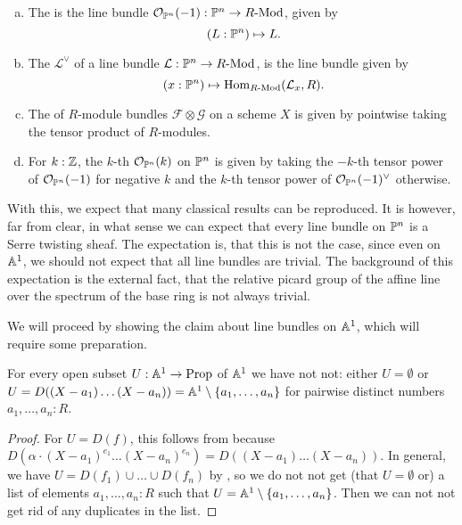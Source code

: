 \begin{definition}
  \begin{enumerate}[(a)]
  \item The  is the line bundle $\mathcal O_{\mathbb{P}^n}(-1):\mathbb{P}^n\to R\text{-}\mathrm{Mod}$,
    given by
    \[ (L:\bP^n)\mapsto L\rlap{.}\]
  \item The  $\mathcal L^\vee$ of a line bundle $\mathcal L:\mathbb{P}^n\to R\text{-}\mathrm{Mod}$,
    is the line bundle given by
    \[ (x:\bP^n)\mapsto \Hom_{\Mod{R}}(\mathcal L_x,R)\rlap{.}\]
  \item The  of $R$-module bundles $\mathcal F\otimes \mathcal G$
    on a scheme $X$
    is given by pointwise taking the tensor product of $R$-modules.
  \item For $k:\mathbb{Z}$, the $k$-th  $\mathcal{O}_{\mathbb{P}^n}(k)$ on $\mathbb{P}^n$
    is given by taking the $-k$-th tensor power of $\mathcal O_{\mathbb{P}^n}(-1)$ for negative $k$
    and the $k$-th tensor power of $\mathcal O_{\mathbb{P}^n}(-1)^{\vee}$ otherwise.
  \end{enumerate}
\end{definition}

With this, we expect that many classical results can be reproduced.
It is however, far from clear, in what sense we can expect that every line bundle on $\mathbb{P}^n$
is a Serre twisting sheaf.
The expectation is, that this is not the case,
since even on $\mathbb{A}^1$, we should not expect that all line bundles are trivial.
The background of this expectation is the external fact, that the relative picard group of
the affine line over the spectrum of the base ring is not always trivial.

We will proceed by showing the claim about line bundles on $\mathbb{A}^1$,
which will require some preparation.

\begin{lemma}
  For every open subset $U : \mathbb{A}^1 \to \mathrm{Prop}$ of $\mathbb{A}^1$
  we have not not:
  either $U = \emptyset$
  or $U = D((X - a_1)\dots(X - a_n)) = \mathbb{A}^1 \setminus \{ a_1, \dots, a_n \}$
  for pairwise distinct numbers $a_1, \dots, a_n : R$.
\end{lemma}

\begin{proof}
  For $U = D(f)$,
  this follows from 
  because $D(\alpha \cdot {(X - a_1)}^{e_1} \dots {(X - a_n)}^{e_n})
  = D((X - a_1) \dots (X - a_n))$.
  In general,
  we have $U = D(f_1) \cup \dots \cup D(f_n)$
  by ,
  so we do not not get
  (that $U = \emptyset$ or)
  a list of elements $a_1, \dots, a_n : R$
  such that $U = \mathbb{A}^1 \setminus \{ a_1, \dots, a_n \}$.
  Then we can not not get rid of any duplicates in the list.
\end{proof}

